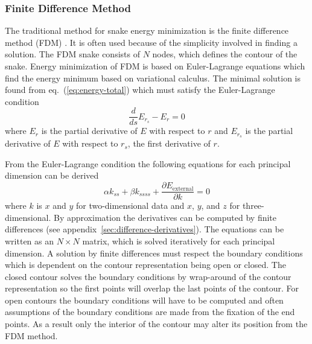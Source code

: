 \subsubsection{Finite Difference Method}
\label{sec:finite-differrence-method}

The traditional method for snake energy minimization is the finite
difference method (FDM)
\citep{kass88,waite90,leymarie92,leymarie93,hassanien99}. It is often
used because of the simplicity involved in finding a solution. The FDM
snake consists of $N$ nodes, which defines the contour of the snake.
Energy minimization of FDM is based on Euler-Lagrange equations which
find the energy minimum based on variational calculus. The minimal
solution is found from eq.~(\ref{eq:energy-total}) which must satisfy
the Euler-Lagrange condition
\begin{equation}
  \nonumber
  \frac{d}{ds}E_{r_{s}} - E_{r} = 0
\end{equation}
where $E_{r}$ is the partial derivative of $E$ with respect to $r$ and
$E_{r_{s}}$ is the partial derivative of $E$ with respect to $r_{s}$,
the first derivative of $r$.

From the Euler-Lagrange condition the following equations for each
principal dimension can be derived
\begin{equation}
  \nonumber
  \alpha k_{ss} + \beta k_{ssss} + \frac{\partial
  E_{\text{external}}}{\partial k} = 0
\end{equation}
where $k$ is $x$ and $y$ for two-dimensional data and $x$, $y$, and
$z$ for three-dimensional. By approximation the derivatives can be
computed by finite differences (see
appendix~\ref{sec:difference-derivatives}). The equations can be
written as an $N \times N$ matrix, which is solved iteratively for
each principal dimension. A solution by finite
differences must respect the boundary conditions which is dependent on
the contour representation being open or closed. The closed contour
solves the boundary conditions by wrap-around of the contour
representation so the first points will overlap the last points of the
contour. For open contours the boundary conditions will have to be
computed and often assumptions of the boundary conditions are made
from the fixation of the end points. As a result only the interior of
the contour may alter its position from the FDM method.

